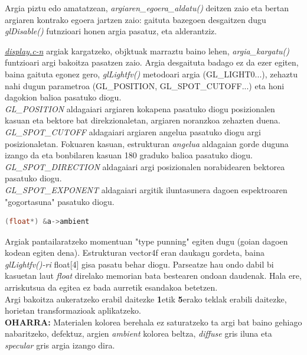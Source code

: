 \documentclass[12pt]{article}
\newcommand{\fitxategi}[1] {\underline{\textit{#1}}}
\newcommand{\metodo}[1] {\textit{#1}}
\newcommand{\aldagai}[1] {\textit{#1}}
\newcommand{\tekla}[1] {\textbf{#1}}
\begin{document}
Argia piztu edo amatatzean, \metodo{argiaren\_egoera\_aldatu()} deitzen zaio eta bertan argiaren kontrako egoera jartzen zaio: gaituta bazegoen desgaitzen dugu \metodo{glDisable()} futnzioari honen argia pasatuz, eta alderantziz.

\fitxategi{display.c-n} argiak kargatzeko, objktuak marraztu baino lehen, \metodo{argia\_kargatu()} funtzioari argi bakoitza pasatzen zaio. Argia desgaituta badago ez da ezer egiten, baina gaituta egonez gero, \metodo{glLightfv()} metodoari argia (GL\_LIGHT0...), zehaztu nahi dugun parametroa (GL\_POSITION, GL\_SPOT\_CUTOFF...) eta honi dagokion balioa pasatuko diogu.\\

\aldagai{GL\_POSITION} aldagaiari argiaren kokapena pasatuko diogu posizionalen kasuan eta bektore bat direkzionaletan, argiaren noranzkoa zehazten duena.\\

\aldagai{GL\_SPOT\_CUTOFF} aldagaiari argiaren angelua pasatuko diogu argi posizionaletan. Fokuaren kasuan, estrukturan \aldagai{angelua} aldagaian gorde duguna izango da eta bonbilaren kasuan 180 graduko balioa pasatuko diogu.\\

\aldagai{GL\_SPOT\_DIRECTION} aldagaiari argi posizionalen norabidearen bektorea pasatuko diogu.\\

\aldagai{GL\_SPOT\_EXPONENT} aldagaiari argitik iluntasunera dagoen espektroaren "gogortasuna" pasatuko diogu.\\

\begin{lstlisting}[language=C]
(float*) &a->ambient
\end{lstlisting}

Argiak pantailaratzeko momentuan "type punning"\cite{punning} egiten dugu (goian dagoen kodean egiten dena). Estrukturan vector4f eran daukagu gordeta, baina \metodo{glLightfv()-ri} float[4] gisa pasatu behar diogu. Parseatze hau ondo dabil bi kasuetan laut \aldagai{float} direlako memorian bata bestearen ondoan daudenak. Hala ere, arriskutsua da egitea ez bada aurretik esandakoa betetzen.\\

Argi bakoitza aukeratzeko erabil daitezke \tekla{1}etik \tekla{5}erako teklak erabili daitezke, horietan transformazioak aplikatzeko.\\

\textbf{OHARRA:} Materialen kolorea berehala ez saturatzeko ta argi bat baino gehiago nabaritzeko, defektuz, argien \aldagai{ambient} kolorea beltza, \aldagai{diffuse} gris iluna eta \aldagai{specular} gris argia izango dira.
\end{document}
